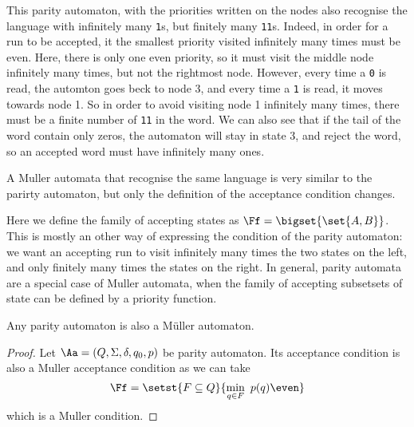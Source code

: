 \begin{examples}
    This parity automaton, with the priorities written on the nodes
    also recognise the language with infinitely many \texttt{1}s,
    but finitely many \texttt{11}s. Indeed, in order for a run
    to be accepted, it the smallest priority visited infinitely many times
    must be even. Here, there is only one even priority, so it must
    visit the middle node infinitely many times, but not the rightmost node.
    However, every time a \texttt{0} is read,
    the automton goes beck to node 3, and every time a \texttt{1} is read,
    it moves towards node 1. So in order to avoid visiting node 1
    infinitely many times, there must be a finite number of \texttt{11}
    in the word. We can also see that if the tail of the word
    contain only zeros, the automaton will stay in state 3, and reject the word,
    so an accepted word must have infinitely many ones.


    A Muller automata that recognise the same language
    is very similar to the parirty automaton, but only the
    definition of the acceptance condition changes.

    \begin{center}
    \end{center}

    Here we define the family of accepting states as $\Ff = \bigset{\set{A, B}}$.
    This is mostly an other way of expressing the condition of
    the parity automaton: we want an accepting run to visit
    infinitely many times the two states on the left, and only finitely
    many times the states on the right.
    In general, parity automata are a special case of Muller automata,
    when the family of accepting subsetsets of state can be defined
    by a priority function.

\end{examples}

\begin{lemma}
    Any parity automaton is also a Müller automaton.
\end{lemma}
\begin{proof}
    Let $\Aa = (Q, \Sigma, \delta, q_0, p)$ be parity automaton.
    Its acceptance condition is also a Muller acceptance condition as we can take
    \[
        \Ff = \setst{F \subseteq Q}{\min_{q \in F} ~p(q) \even}
    \]
    which is a Muller condition.
\end{proof}

